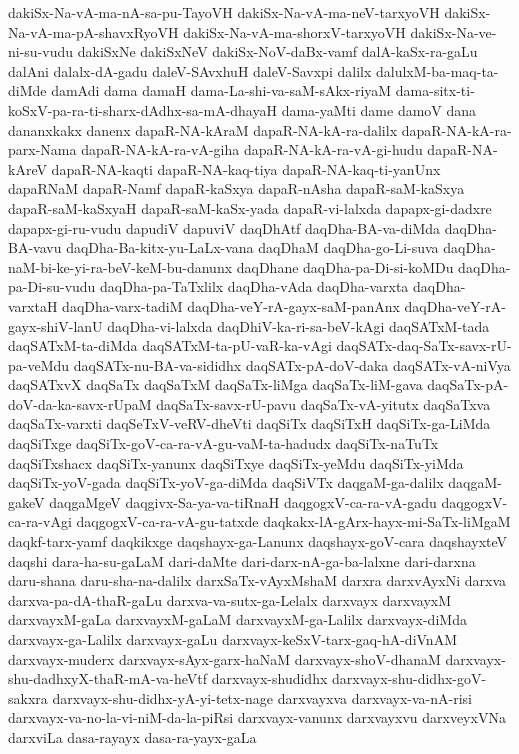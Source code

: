 {dakiSx-Na-vA-ma-nA-sa-pu-TayoVH
dakiSx-Na-vA-ma-neV-tarxyoVH
dakiSx-Na-vA-ma-pA-shavxRyoVH
dakiSx-Na-vA-ma-shorxV-tarxyoVH
dakiSx-Na-ve-ni-su-vudu
dakiSxNe
dakiSxNeV
dakiSx-NoV-daBx-vamf
dalA-kaSx-ra-gaLu
dalAni
dalalx-dA-gadu
daleV-SAvxhuH
daleV-Savxpi
dalilx
dalulxM-ba-maq-ta-diMde
damAdi
dama
damaH
dama-La-shi-va-saM-sAkx-riyaM
dama-sitx-ti-koSxV-pa-ra-ti-sharx-dAdhx-sa-mA-dhayaH
dama-yaMti
dame
damoV
dana
dananxkakx
danenx
dapaR-NA-kAraM
dapaR-NA-kA-ra-dalilx
dapaR-NA-kA-ra-parx-Nama
dapaR-NA-kA-ra-vA-giha
dapaR-NA-kA-ra-vA-gi-hudu
dapaR-NA-kAreV
dapaR-NA-kaqti
dapaR-NA-kaq-tiya
dapaR-NA-kaq-ti-yanUnx
dapaRNaM
dapaR-Namf
dapaR-kaSxya
dapaR-nAsha
dapaR-saM-kaSxya
dapaR-saM-kaSxyaH
dapaR-saM-kaSx-yada
dapaR-vi-lalxda
dapapx-gi-dadxre
dapapx-gi-ru-vudu
dapudiV
dapuviV
daqDhAtf
daqDha-BA-va-diMda
daqDha-BA-vavu
daqDha-Ba-kitx-yu-LaLx-vana
daqDhaM
daqDha-go-Li-suva
daqDha-naM-bi-ke-yi-ra-beV-keM-bu-danunx
daqDhane
daqDha-pa-Di-si-koMDu
daqDha-pa-Di-su-vudu
daqDha-pa-TaTxlilx
daqDha-vAda
daqDha-varxta
daqDha-varxtaH
daqDha-varx-tadiM
daqDha-veY-rA-gayx-saM-panAnx
daqDha-veY-rA-gayx-shiV-lanU
daqDha-vi-lalxda
daqDhiV-ka-ri-sa-beV-kAgi
daqSATxM-tada
daqSATxM-ta-diMda
daqSATxM-ta-pU-vaR-ka-vAgi
daqSATx-daq-SaTx-savx-rU-pa-veMdu
daqSATx-nu-BA-va-sididhx
daqSATx-pA-doV-daka
daqSATx-vA-niVya
daqSATxvX
daqSaTx
daqSaTxM
daqSaTx-liMga
daqSaTx-liM-gava
daqSaTx-pA-doV-da-ka-savx-rUpaM
daqSaTx-savx-rU-pavu
daqSaTx-vA-yitutx
daqSaTxva
daqSaTx-varxti
daqSeTxV-veRV-dheVti
daqSiTx
daqSiTxH
daqSiTx-ga-LiMda
daqSiTxge
daqSiTx-goV-ca-ra-vA-gu-vaM-ta-hadudx
daqSiTx-naTuTx
daqSiTxshacx
daqSiTx-yanunx
daqSiTxye
daqSiTx-yeMdu
daqSiTx-yiMda
daqSiTx-yoV-gada
daqSiTx-yoV-ga-diMda
daqSiVTx
daqgaM-ga-dalilx
daqgaM-gakeV
daqgaMgeV
daqgivx-Sa-ya-va-tiRnaH
daqgogxV-ca-ra-vA-gadu
daqgogxV-ca-ra-vAgi
daqgogxV-ca-ra-vA-gu-tatxde
daqkakx-lA-gArx-hayx-mi-SaTx-liMgaM
daqkf-tarx-yamf
daqkikxge
daqshayx-ga-Lanunx
daqshayx-goV-cara
daqshayxteV
daqshi
dara-ha-su-gaLaM
dari-daMte
dari-darx-nA-ga-ba-lalxne
dari-darxna
daru-shana
daru-sha-na-dalilx
darxSaTx-vAyxMshaM
darxra
darxvAyxNi
darxva
darxva-pa-dA-thaR-gaLu
darxva-va-sutx-ga-Lelalx
darxvayx
darxvayxM
darxvayxM-gaLa
darxvayxM-gaLaM
darxvayxM-ga-Lalilx
darxvayx-diMda
darxvayx-ga-Lalilx
darxvayx-gaLu
darxvayx-keSxV-tarx-gaq-hA-diVnAM
darxvayx-muderx
darxvayx-sAyx-garx-haNaM
darxvayx-shoV-dhanaM
darxvayx-shu-dadhxyX-thaR-mA-va-heVtf
darxvayx-shudidhx
darxvayx-shu-didhx-goV-sakxra
darxvayx-shu-didhx-yA-yi-tetx-nage
darxvayxva
darxvayx-va-nA-risi
darxvayx-va-no-la-vi-niM-da-la-piRsi
darxvayx-vanunx
darxvayxvu
darxveyxVNa
darxviLa
dasa-rayayx
dasa-ra-yayx-gaLa
}
